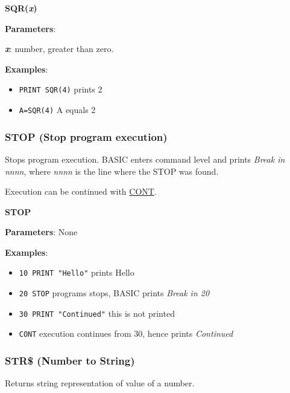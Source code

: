     \hspace{1.9cm}\textbf{SQR(\textit{x})}

    \textbf{Parameters}:

    \hspace{1cm}\textbf{\textit{x}}: number, greater than zero.

    \textbf{Examples}:
    \begin{itemize}
        \item \texttt{PRINT SQR(4)} prints 2
        \item \texttt{A=SQR(4)} A equals 2
    \end{itemize}

    \subsubsection{{STOP (Stop program execution)}}
    \label{msbasic:lang:stop}
    Stops program execution. BASIC enters command level and prints
    \textit{Break in nnnn}, where \textit{nnnn} is the line where the STOP was
    found.

    Execution can be continued with \hyperref[msbasic:lang:cont]{CONT}.

    \hspace{1.9cm}\textbf{STOP}

    \textbf{Parameters}: None

    \textbf{Examples}:
    \begin{itemize}
        \item \texttt{10 PRINT "Hello"} prints Hello
        \item \texttt{20 STOP} programs stops, BASIC prints \textit{Break in 20}
        \item \texttt{30 PRINT "Continued"} this is not printed
        \item \texttt{CONT} execution continues from 30, hence prints
        \textit{Continued}
    \end{itemize}

    \subsubsection{{STR\$ (Number to String)}}
    \label{msbasic:lang:str}
    Returns string representation of value of a number.

